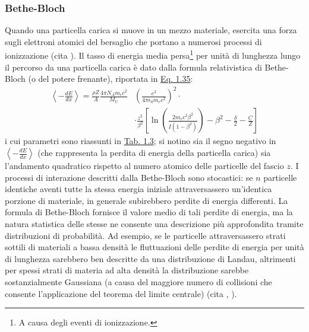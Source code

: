 \documentclass[12pt,a4paper,twoside]{report}
\begin{document}
	\subsubsection{Bethe-Bloch}\label{par:bethe_bloch}
	Quando una particella carica si muove in un mezzo materiale, esercita una forza sugli elettroni atomici del bersaglio che portano a numerosi processi di ionizzazione (cita
	). Il tasso di energia media persa\footnote{A causa degli eventi di ionizzazione.} per unità di lunghezza lungo il percorso da una particella carica è dato dalla formula relativistica di Bethe-Bloch (o del potere frenante), riportata in \hyperref[eq:bethe_bloch]{Eq. 1.35}:
	\begin{equation}
		\begin{split}
			\left\langle-\frac{dE}{dx} \right\rangle=\frac{\rho Z}{A}\frac{4\pi N_Am_ec^2}{M_U}&\left(\frac{e^2}{4\pi\epsilon_0m_ec^2}\right)^2\cdot\\
			&\cdot\frac{z^2}{\beta^2}\left[\ln{\left(\frac{2m_ec^2\beta^2}{I\left(1-\beta^2\right)}\right)}-\beta^2-\frac{\delta}{2}-\frac{C}{Z}\right]
		\end{split}
		\label{eq:bethe_bloch}
	\end{equation}
	i cui parametri sono riassunti in \hyperref[tab:bethe_bloch]{Tab. 1.3}; si notino sia il segno negativo in $\left\langle-\frac{dE}{dx} \right\rangle$ (che rappresenta la perdita di energia della particella carica) sia l'andamento quadratico rispetto al numero atomico delle particelle del fascio $z$. I processi di interazione descritti dalla Bethe-Bloch sono stocastici: se $n$ particelle identiche aventi tutte la stessa energia iniziale attraversassero un'identica porzione di materiale, in generale subirebbero perdite di energia differenti. La formula di Bethe-Bloch fornisce il valore medio di tali perdite di energia, ma la natura statistica delle stesse ne consente una descrizione più approfondita tramite distribuzioni di probabilità. Ad esempio, se le particelle attraversassero strati sottili di materiali a bassa densità le fluttuazioni delle perdite di energia per unità di lunghezza sarebbero ben descritte da una distribuzione di Landau, altrimenti per spessi strati di materia ad alta densità la distribuzione sarebbe sostanzialmente Gaussiana (a causa del maggiore numero di collisioni che consente l'applicazione del teorema del limite centrale) (cita
	,
	).
\end{document}
